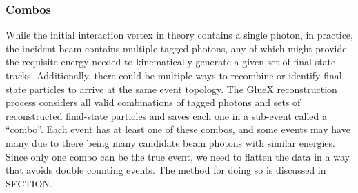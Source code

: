 \subsubsection{Combos}\label{subsub:combos}

While the initial interaction vertex in theory contains a single photon, in practice, the incident beam contains multiple tagged photons, any of which might provide the requisite energy needed to kinematically generate a given set of final-state tracks. Additionally, there could be multiple ways to recombine or identify final-state particles to arrive at the same event topology. The GlueX reconstruction process considers all valid combinations of tagged photons and sets of reconstructed final-state particles and saves each one in a sub-event called a ``combo''. Each event has at least one of these combos, and some events may have many due to there being many candidate beam photons with similar energies. Since only one combo can be the true event, we need to flatten the data in a way that avoids double counting events. The method for doing so is discussed in {\color{red} SECTION}.
